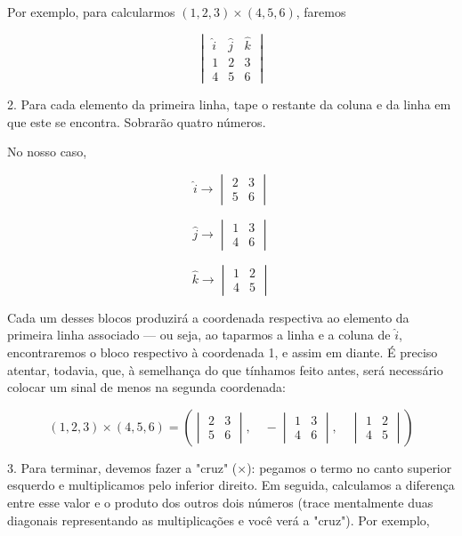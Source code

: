 Por exemplo, para calcularmos \((1, 2, 3) \times (4, 5, 6)\), faremos

\[
\begin{vmatrix} \hat{i} & \hat{j} & \hat{k} \\ 1 & 2 & 3 \\ 4 & 5 & 6 \end{vmatrix}
\]

2. Para cada elemento da primeira linha, tape o restante da coluna e da linha em que este se encontra. Sobrarão quatro números.

No nosso caso,

\[
\hat{i} \to \begin{vmatrix} 2 & 3 \\ 5 & 6 \end{vmatrix}
\]


\[
\hat{j} \to \begin{vmatrix} 1 & 3 \\ 4 & 6 \end{vmatrix}
\]


\[
\hat{k} \to \begin{vmatrix} 1 & 2 \\ 4 & 5 \end{vmatrix}
\]

Cada um desses blocos produzirá a coordenada respectiva ao elemento da primeira linha associado — ou seja, ao taparmos a linha e a coluna de \(\hat{i}\), encontraremos o bloco respectivo à coordenada 1, e assim em diante. É preciso atentar, todavia, que, à semelhança do que tínhamos feito antes, será necessário colocar um sinal de menos na segunda coordenada:

\[ (1, 2, 3) \times (4, 5, 6) = 
\left(
\begin{vmatrix} 2 & 3 \\ 5 & 6 \end{vmatrix},\quad
-\begin{vmatrix} 1 & 3 \\ 4 & 6 \end{vmatrix},\quad
\begin{vmatrix} 1 & 2 \\ 4 & 5 \end{vmatrix}
\right)
\]

3. Para terminar, devemos fazer a "cruz" (\(\times\)): pegamos o termo no canto superior esquerdo e multiplicamos pelo inferior direito. Em seguida, calculamos a diferença entre esse valor e o produto dos outros dois números (trace mentalmente duas diagonais representando as multiplicações e você verá a "cruz"). Por exemplo,

